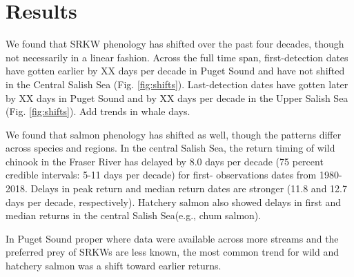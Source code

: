 \documentclass{article}
\begin{document}
\section*{Results}
\par We found that SRKW phenology has shifted over the past four decades, though not necessarily in a linear fashion. Across the full time span, first-detection dates have gotten earlier by XX days per decade in Puget Sound and have not shifted in the Central Salish Sea (Fig. \ref{fig:shifts}). 
Last-detection dates have gotten later by XX days in Puget Sound and by XX days per decade in the Upper Salish Sea (Fig. \ref{fig:shifts}). Add trends in whale days. %
\par We found that salmon phenology has shifted as well, though the patterns differ across species and regions. In the central Salish Sea, the return timing of wild chinook in the Fraser River has delayed by 8.0 days per decade (75 percent credible intervals: 5-11 days per decade) for first- observations dates from 1980-2018.  Delays in peak return and median return dates are stronger (11.8 and 12.7 days per decade, respectively). Hatchery salmon also showed delays in first and median returns in the central Salish Sea(e.g., chum salmon).
\par In Puget Sound proper where data were available across more streams and the preferred prey of SRKWs are less known, the most common trend for wild and hatchery salmon was a shift toward earlier returns.
\end{document}

